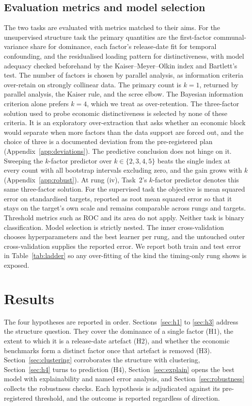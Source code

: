 \subsection{Evaluation metrics and model selection}\label{sec:metrics}
The two tasks are evaluated with metrics matched to their aims. For the unsupervised structure task the
primary quantities are the first-factor communal-variance share for dominance, each factor's
release-date fit for temporal confounding, and the residualised loading pattern for distinctiveness,
with model adequacy checked beforehand by the Kaiser--Meyer--Olkin index and Bartlett's test. The number
of factors is chosen by parallel analysis, as information criteria over-retain on
strongly collinear data. The primary count is $k=1$, returned by
parallel analysis, the Kaiser rule, and the scree elbow. The Bayesian information criterion alone prefers
$k=4$, which we treat as over-retention. The three-factor solution used to probe economic distinctiveness
is selected by none of these criteria. It is an exploratory over-extraction that asks whether an economic
block would separate when more factors than the data support are forced out, and the choice of
three is a documented deviation from the pre-registered plan (Appendix~\ref{app:deviations}). The
predictive conclusion does not hinge on it. Sweeping the $k$-factor predictor over $k \in \{2,3,4,5\}$
beats the single index at every count with all bootstrap intervals excluding zero, and the gain grows
with $k$ (Appendix~\ref{app:robust}). At rung (iv), Task~2's $k$-factor predictor
denotes this same three-factor solution. For the supervised task the objective is mean squared error on standardised targets, reported as root
mean squared error so that it stays on the target's own scale and remains comparable across rungs and
targets. Threshold metrics such as ROC and its area do not apply. Neither task is binary
classification. Model selection is strictly nested. The inner cross-validation chooses hyperparameters and the best learner per rung, and the untouched outer cross-validation supplies the reported error. We report both train and test error in Table~\ref{tab:ladder} so any over-fitting of the kind the
timing-only rung shows is exposed.

\section{Results}\label{sec:results}
The four hypotheses are reported in order. Sections~\ref{sec:h1} to \ref{sec:h3} address the structure question. They cover the dominance of a single factor (H1), the extent to which it is a release-date artefact (H2), and whether the economic benchmarks form a distinct factor once that artefact is removed
(H3). Section~\ref{sec:clustering} corroborates the structure with clustering, Section~\ref{sec:h4}
turns to prediction (H4), Section~\ref{sec:explain} opens the best model with explainability and named
error analysis, and Section~\ref{sec:robustness} collects the robustness checks. Each hypothesis is
adjudicated against its pre-registered threshold, and the outcome is reported regardless of direction.

